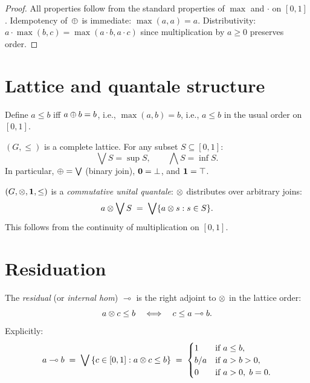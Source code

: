 \begin{proof}
All properties follow from the standard properties of $\max$ and
$\cdot$ on $[0,1]$.  Idempotency of~$\oplus$ is immediate:
$\max(a,a) = a$.  Distributivity: $a \cdot \max(b,c) = \max(a \cdot b,
a \cdot c)$ since multiplication by $a \geq 0$ preserves order.
\end{proof}

\section{Lattice and quantale structure}
\label{sec:quantale}

\begin{definition}
\label{def:partial-order}
Define $a \leq b$ iff $a \oplus b = b$, i.e., $\max(a,b) = b$, i.e.,
$a \leq b$ in the usual order on $[0,1]$.
\end{definition}

\begin{theorem}
\label{thm:lattice}
$(G, \leq)$ is a complete lattice.  For any subset
$S \subseteq [0,1]$:
\[
  \bigvee S = \sup S, \qquad
  \bigwedge S = \inf S.
\]
In particular, $\oplus = \bigvee$ (binary join), $\mathbf{0} = \bot$, and
$\mathbf{1} = \top$.
\end{theorem}

\begin{theorem}[Quantale]
\label{thm:quantale}
$(G, \otimes, \mathbf{1}, \leq)$ is a \emph{commutative unital quantale}:
$\otimes$ distributes over arbitrary joins:
\[
  a \otimes \bigvee S \;=\; \bigvee \{a \otimes s : s \in S\}.
\]
This follows from the continuity of multiplication on $[0,1]$.
\end{theorem}

\section{Residuation}
\label{sec:residuation}

\begin{definition}[Residuation]
\label{def:residuation-p2}
The \emph{residual} (or \emph{internal hom}) $\multimap$ is the right
adjoint to $\otimes$ in the lattice order:
\[
  a \otimes c \leq b
  \quad\Longleftrightarrow\quad
  c \leq a \multimap b.
\]
Explicitly:
\[
  a \multimap b \;=\;
  \bigvee\, \{c \in [0,1] : a \otimes c \leq b\}
  \;=\;
  \begin{cases}
    1 & \text{if } a \leq b, \\
    b / a & \text{if } a > b > 0, \\
    0 & \text{if } a > 0,\; b = 0.
  \end{cases}
\]
\end{definition}

